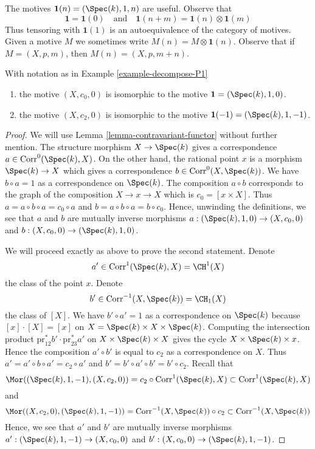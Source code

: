 \noindent
The motives $\mathbf{1}(n) = (\Spec(k), 1, n)$ are useful. Observe that
$$
\mathbf{1} = \mathbf{1}(0)
\quad\text{and}\quad
\mathbf{1}(n + m) = \mathbf{1}(n) \otimes \mathbf{1}(m)
$$
Thus tensoring with $\mathbf{1}(1)$ is an autoequivalence of the
category of motives. Given a motive $M$ we sometimes write
$M(n) = M \otimes \mathbf{1}(n)$. Observe that if $M = (X, p, m)$,
then $M(n) = (X, p, m + n)$.

\begin{lemma}
\label{lemma-inverse-h2}
With notation as in Example \ref{example-decompose-P1}
\begin{enumerate}
\item
the motive $(X, c_0, 0)$ is isomorphic to the motive
$\mathbf{1} = (\Spec(k), 1, 0)$.
\item
the motive $(X, c_2, 0)$ is isomorphic to the motive
$\mathbf{1}(-1) = (\Spec(k), 1, -1)$.
\end{enumerate}
\end{lemma}

\begin{proof}
We will use Lemma \ref{lemma-contravariant-functor} without further mention.
The structure morphism $X \to \Spec(k)$ gives a correspondence
$a \in \text{Corr}^0(\Spec(k), X)$. On the other hand, the rational
point $x$ is a morphism $\Spec(k) \to X$ which gives a correspondence
$b \in \text{Corr}^0(X, \Spec(k))$. We have $b \circ a = 1$ as a
correspondence on $\Spec(k)$. The composition $a \circ b$ corresponds
to the graph of the composition $X \to x \to X$ which is
$c_0 = [x \times X]$. Thus $a = a \circ b \circ a = c_0 \circ a$
and $b = a \circ b \circ a = b \circ c_0$.
Hence, unwinding the definitions, we see that
$a$ and $b$ are mutually inverse morphisms
$a : (\Spec(k), 1, 0) \to (X, c_0, 0)$ and
$b : (X, c_0, 0) \to (\Spec(k), 1, 0)$.

\medskip\noindent
We will proceed exactly as above to prove the second statement.
Denote
$$
a' \in \text{Corr}^1(\Spec(k), X) = \CH^1(X)
$$
the class of the point $x$. Denote
$$
b' \in \text{Corr}^{-1}(X, \Spec(k)) = \CH_1(X)
$$
the class of $[X]$. We have $b' \circ a' = 1$ as a correspondence
on $\Spec(k)$ because $[x] \cdot [X] = [x]$ on
$X = \Spec(k) \times X \times \Spec(k)$. Computing the
intersection product $\text{pr}_{12}^*b' \cdot \text{pr}_{23}^*a'$
on $X \times \Spec(k) \times X$ gives the cycle
$X \times \Spec(k) \times x$. Hence
the composition $a' \circ b'$ is equal to $c_2$ as a
correspondence on $X$. Thus $a' = a' \circ b \circ a' = c_2 \circ a'$
and $b' = b' \circ a' \circ b' = b' \circ c_2$. Recall that
$$
\Mor((\Spec(k), 1, -1), (X, c_2, 0)) =
c_2 \circ \text{Corr}^1(\Spec(k), X)
\subset
\text{Corr}^1(\Spec(k), X)
$$
and
$$
\Mor((X, c_2, 0), (\Spec(k), 1, -1)) =
\text{Corr}^{-1}(X, \Spec(k)) \circ c_2
\subset
\text{Corr}^{-1}(X, \Spec(k))
$$
Hence, we see that $a'$ and $b'$ are mutually inverse morphisms
$a' : (\Spec(k), 1, -1) \to (X, c_0, 0)$ and
$b' : (X, c_0, 0) \to (\Spec(k), 1, -1)$.
\end{proof}

